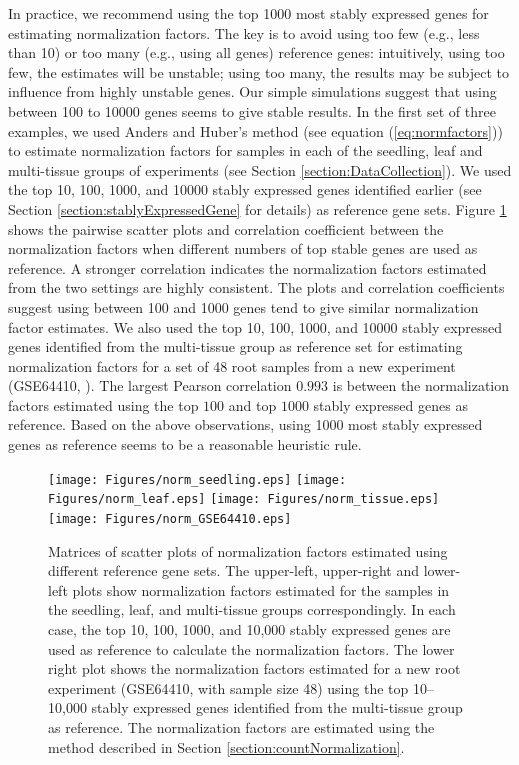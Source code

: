 \documentclass[letterpaper,12pt]{article}
\begin{document}
In practice, we recommend using the top 1000 most stably expressed genes for
estimating normalization factors. The key is to avoid using too few (e.g.,
less than 10) or too many (e.g., using all genes) reference genes:
intuitively, using too few, the estimates will be unstable; using too many,
the results may be subject to influence from highly unstable genes.
Our simple simulations suggest that using between 100 to 10000 genes seems to
give stable results. In the first set of three examples, we used Anders and
Huber's method (see equation (\ref{eq:normfactors})) to estimate normalization
factors for samples in each of the seedling, leaf and multi-tissue groups of
experiments (see Section \ref{section:DataCollection}).  We used the top 10,
100, 1000, and 10000 stably expressed genes identified earlier (see Section
\ref{section:stablyExpressedGene} for details) as reference gene sets. Figure
\ref{fig:normfactor} shows the pairwise scatter plots and correlation
coefficient between the normalization factors when different numbers of top
stable genes are used as reference. A stronger correlation indicates the
normalization factors estimated from the two settings are highly consistent.
The plots and correlation coefficients suggest using between 100 and 1000
genes tend to give similar normalization factor estimates. We also used the
top 10, 100, 1000, and 10000 stably expressed genes identified from the
multi-tissue group as reference set for estimating normalization factors for a set
of 48 root samples from a new experiment (GSE64410, \cite{vragovic2015translatome}). The largest Pearson correlation
$0.993$ is between the normalization factors estimated using the top $100$
and top $1000$ stably expressed genes as reference. Based on the above
observations, using 1000 most stably expressed genes as reference seems to be
a reasonable heuristic rule.




\begin{figure}[!ht]
	\begin{center}
		\texttt{[image: Figures/norm\_seedling.eps]}
		\texttt{[image: Figures/norm\_leaf.eps]}
		\texttt{[image: Figures/norm\_tissue.eps]}
		\texttt{[image: Figures/norm\_GSE64410.eps]}
		\caption{Matrices of scatter plots of normalization factors
		estimated using different reference gene sets. 
		The upper-left, upper-right and lower-left plots show
		normalization factors estimated for the samples in the
		seedling, leaf, and multi-tissue groups correspondingly. 
		In each case, the top 10, 100, 1000, and 10,000 stably
		expressed genes are used as reference to
		calculate the normalization factors.
		The lower right plot shows the normalization factors estimated for a new root
		experiment (GSE64410, with sample size 48) using the top 10--10,000
		stably expressed genes identified from the multi-tissue group as
		reference. The normalization factors are estimated using the
		method described in Section \ref{section:countNormalization}.}
		\label{fig:normfactor} \end{center} \end{figure}
\end{document}
